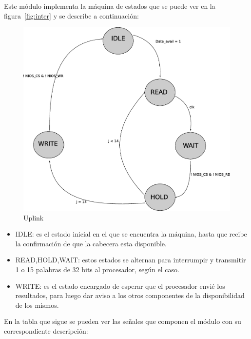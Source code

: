 Este módulo implementa la máquina de estados que se puede ver en la figura~\ref{fig:inter} y se describe a continuación:

\begin{figure}[H]
  \centering
	\includegraphics[scale=0.45]{3-arquitectura/graf/estuplinkcompleto.eps}
  \caption{Uplink}
  \label{fig:estuplink}
\end{figure}

\begin{itemize}
	\item IDLE: es el estado inicial en el que se encuentra la máquina, hasta que recibe la confirmación de que la cabecera esta disponible.
	\item READ,HOLD,WAIT: estos estados se alternan para interrumpir y transmitir 1 o 15 palabras de 32 bits al procesador, según el caso.
	\item WRITE: es el estado encargado de esperar que el procesador envié los resultados, para luego dar aviso a los otros componentes de la disponibilidad de los mismos.
\end{itemize}

En la tabla que sigue se pueden ver las señales que componen el módulo con su correspondiente descripción:


